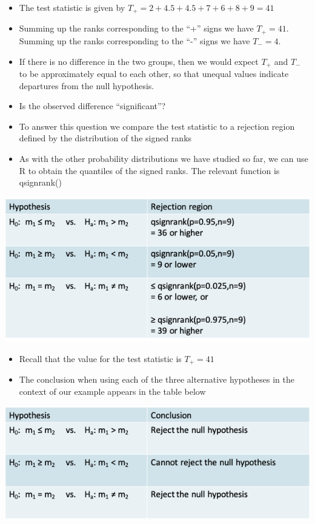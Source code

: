 \documentclass[
]{book}
\providecommand{\tightlist}{%
  \setlength{\itemsep}{0pt}\setlength{\parskip}{0pt}}
\begin{document}
\begin{itemize}
\tightlist
\item
  The test statistic is given by \(T_+ = 2+4.5+4.5+7+6+8+9 = 41\)
\item
  Summing up the ranks corresponding to the ``+'' signs we have \(T_+ = 41\).\\
  Summing up the ranks corresponding to the ``-'' signs we have \(T_- = 4\).
\item
  If there is no difference in the two groups, then we would expect \(T_+\) and \(T_-\) to be approximately equal to each other, so that unequal values indicate departures from the null hypothesis.
\item
  Is the observed difference ``significant''?
\item
  To answer this question we compare the test statistic to a rejection region defined by the distribution of the signed ranks
\item
  As with the other probability distributions we have studied so far, we can use R to obtain the quantiles of the signed ranks. The relevant function is qsignrank()
\end{itemize}

\includegraphics[width=0.7\linewidth]{./9_21}

\begin{itemize}
\tightlist
\item
  Recall that the value for the test statistic is \(T_+ = 41\)
\item
  The conclusion when using each of the three alternative hypotheses in the context of our example appears in the table below
\end{itemize}

\includegraphics[width=0.7\linewidth]{./9_22}
\end{document}

